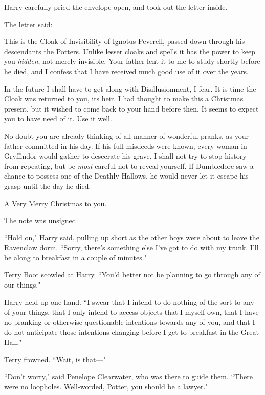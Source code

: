 Harry carefully pried the envelope open, and took out the letter inside.

The letter said:

\begin{writtenNote}
This is the Cloak of Invisibility of Ignotus Peverell, passed down through his descendants the Potters. Unlike lesser cloaks and spells it has the power to keep you \emph{hidden}, not merely invisible. Your father lent it to me to study shortly before he died, and I confess that I have received much good use of it over the years.

In the future I shall have to get along with Disillusionment, I fear. It is time the Cloak was returned to you, its heir. I had thought to make this a Christmas present, but it wished to come back to your hand before then. It seems to expect you to have need of it. Use it well.

No doubt you are already thinking of all manner of wonderful pranks, as your father committed in his day. If his full misdeeds were known, every woman in Gryffindor would gather to desecrate his grave. I shall not try to stop history from repeating, but be \emph{most} careful not to reveal yourself. If Dumbledore saw a chance to possess one of the Deathly Hallows, he would never let it escape his grasp until the day he died.

A Very Merry Christmas to you.
\end{writtenNote}

The note was unsigned.

\later

``Hold on," Harry said, pulling up short as the other boys were about to leave the Ravenclaw dorm. ``Sorry, there's something else I've got to do with my trunk. I'll be along to breakfast in a couple of minutes."

Terry Boot scowled at Harry. ``You'd better not be planning to go through any of our things."

Harry held up one hand. ``I swear that I intend to do nothing of the sort to any of your things, that I only intend to access objects that I myself own, that I have no pranking or otherwise questionable intentions towards any of you, and that I do not anticipate those intentions changing before I get to breakfast in the Great Hall."

Terry frowned. ``Wait, is that---"

``Don't worry," said Penelope Clearwater, who was there to guide them. ``There were no loopholes. Well-worded, Potter, you should be a lawyer."

